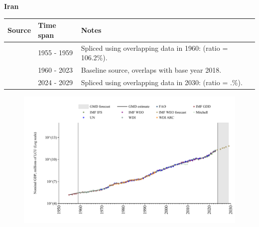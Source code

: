 \documentclass[12pt,a4paper,landscape]{article}
\begin{document}
\begin{adjustbox}{max totalsize={\paperwidth}{\paperheight},center}
\begin{minipage}[t][\textheight][t]{\textwidth}
\vspace*{0.5cm}
{}
\begin{center}
{\Large\bfseries Iran}
\end{center}
\vspace{0.5cm}
\begin{table}[H]
\centering
\small
\begin{tabular}{|l|l|l|}
\hline
\textbf{Source} & \textbf{Time span} & \textbf{Notes} \\
\hline
\rowcolor{white}\cite{IMF_GDD}& 1955 - 1959 &Spliced using overlapping data in 1960: (ratio = 106.2\%).\\
\rowcolor{lightgray}\cite{WDI}& 1960 - 2023 &Baseline source, overlaps with base year 2018.\\
\rowcolor{white}\cite{IMF_WEO_forecast}& 2024 - 2029 &Spliced using overlapping data in 2030: (ratio = .\%).\\
\hline
\end{tabular}
\end{table}
\begin{figure}[H]
\centering
\includegraphics[width=\textwidth,height=0.6\textheight,keepaspectratio]{graphs/IRN_nGDP.pdf}
\end{figure}
\end{minipage}
\end{adjustbox}
\end{document}
